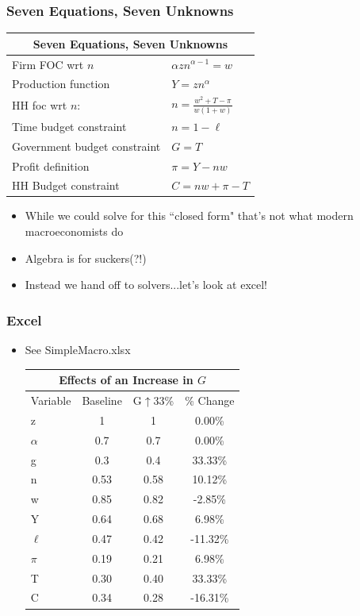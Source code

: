 \documentclass{beamer}
\begin{document}
\begin{frame}
\frametitle[alignment=center]{Seven Equations, Seven Unknowns}
\begin{table}
\begin{tabular}{ll}
\multicolumn{2}{c}{Seven Equations, Seven Unknowns}\\
\hline\hline
Firm FOC wrt $n$ & $\alpha zn^{\alpha-1}=w$ \\
Production function & $Y=zn^{\alpha}$\\
 HH foc wrt $n$:  & $n=\frac{w^2+T-\pi}{w(1+w)}$\\
 Time budget constraint & $n=1-\ell$\\
 Government budget constraint & $G=T$\\
 Profit definition & $\pi=Y-nw$\\
  HH Budget constraint & $C=nw+\pi-T$\\
  \hline
\end{tabular}
\end{table}
\begin{itemize}
\item While we could solve for this ``closed form" that's not what modern macroeconomists do 
\bigskip
\item Algebra is for suckers(?!)
\bigskip
\item Instead we hand off to solvers...let's look at excel!
\end{itemize}
\end{frame}


\begin{frame}
\frametitle[alignment=center]{Excel}
\begin{itemize}
\item See SimpleMacro.xlsx
\begin{table}
\begin{tabular}{lccc}
\multicolumn{4}{c}{Effects of an Increase in $G$}\\
\hline\hline
Variable & Baseline & G$\uparrow$33\% & \% Change\\
\hline
z & 1 & 1 & 0.00\%\\
$\alpha$ & 0.7 & 0.7 & 0.00\%\\
g & 0.3 & 0.4 & 33.33\%\\
n & 0.53 & 0.58 & 10.12\%\\
w & 0.85 & 0.82 & -2.85\%\\
Y & 0.64 & 0.68 & 6.98\%\\
$\ell$ & 0.47 & 0.42 & -11.32\%\\
$\pi$ & 0.19 & 0.21 & 6.98\%\\
T & 0.30 & 0.40 & 33.33\%\\
C & 0.34 & 0.28 & -16.31\%\\
\hline\hline
\end{tabular}
\end{table}
\end{itemize}
\end{frame}
\end{document}
